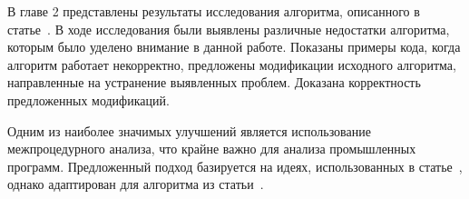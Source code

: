 \FloatBarrier

\chapterconclusion

В главе 2 представлены результаты исследования алгоритма,
описанного в статье~\cite{li2010practical}. В ходе исследования были
выявлены различные недостатки алгоритма, которым было уделено внимание
в данной работе. Показаны примеры кода, когда алгоритм работает
некорректно, предложены модификации исходного алгоритма, направленные
на устранение выявленных проблем. Доказана корректность предложенных
модификаций.

Одним из наиболее значимых улучшений является использование
межпроцедурного анализа, что крайне важно для анализа промышленных
программ. Предложенный подход базируется на идеях, использованных в
статье~\cite{xie2003archer}, однако адаптирован для алгоритма из
статьи~\cite{li2010practical}.
